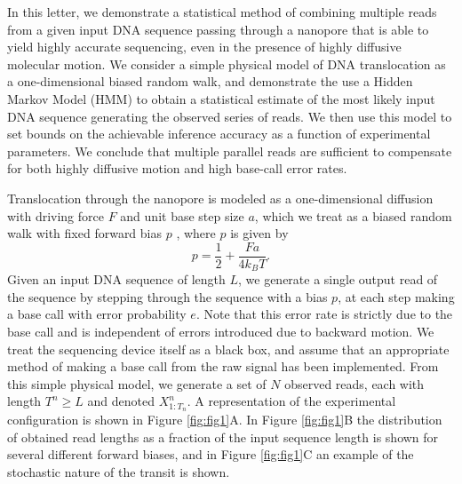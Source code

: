 \documentclass{biophys_letter}
\begin{document}
\begin{multicols}{2}
In this letter, we demonstrate a statistical method of combining multiple reads from a given input DNA sequence passing through a nanopore that is able to yield highly accurate sequencing, even in the presence of highly diffusive molecular motion.
We consider a simple physical model of DNA translocation as a one-dimensional biased random walk, and demonstrate the use a Hidden Markov Model (HMM) to obtain a statistical estimate of the most likely input DNA sequence generating the observed series of reads.
We then use this model to set bounds on the achievable inference accuracy as a function of experimental parameters.
We conclude that multiple parallel reads are sufficient to compensate for both highly diffusive motion and high base-call error rates.

Translocation through the nanopore is modeled as a one-dimensional diffusion with driving force $F$ and unit base step size $a$, which we treat as a biased random walk with fixed forward bias $p$ \cite{Berg:1993}, where $p$ is given by
\begin{equation}
p = \frac{1}{2} + \frac{Fa}{4k_{B}T}.
\end{equation}
Given an input DNA sequence of length $L$, we generate a single output read of the sequence by stepping through the sequence with a bias $p$, at each step making a base call with error probability $e$.
Note that this error rate is strictly due to the base call and is independent of errors introduced due to backward motion. 
We treat the sequencing device itself as a black box, and assume that an appropriate method of making a base call from the raw signal has been implemented.
From this simple physical model, we generate a set of $N$ observed reads, each with length $T^{n} \ge L$ and denoted $X^n_{1:T_n}$.
A representation of the experimental configuration is shown in Figure \ref{fig:fig1}A.
In Figure \ref{fig:fig1}B the distribution of obtained read lengths as a fraction of the input sequence length is shown for several different forward biases, and in Figure \ref{fig:fig1}C an example of the stochastic nature of the transit is shown.

\end{multicols}
\end{document}
